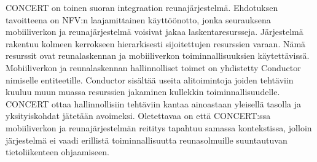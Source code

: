 CONCERT on toinen suoran integraation reunajärjestelmä. Ehdotuksen tavoitteena on NFV:n laajamittainen käyttöönotto, jonka seurauksena mobiiliverkon ja reunajärjestelmä voisivat jakaa laskentaresursseja. Järjestelmä rakentuu kolmeen kerrokseen hierarkisesti sijoitettujen resurssien varaan. Nämä resurssit ovat reunalaskennan ja mobiiliverkon toiminnallisuuksien käytettävissä. 
Mobiiliverkon ja reunalaskennan hallinnolliset toimet on yhdistetty Conductor nimiselle entiteetille. Conductor sisältää useita alitoimintoja joiden tehtäviin kuuluu muun muassa resurssien jakaminen kullekkin toiminnallisuudelle. CONCERT ottaa hallinnollisiin tehtäviin kantaa ainoastaan yleisellä tasolla ja yksityiskohdat jätetään avoimeksi. Oletettavaa on että CONCERT:ssa mobiiliverkon ja reunajärjestelmän reititys tapahtuu samassa kontekstissa, jolloin järjestelmä ei vaadi erillistä toiminnallisuutta reunasolmuille suuntautuvan tietoliikenteen ohjaamiseen. 


